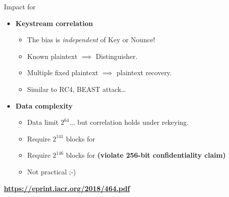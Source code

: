 \documentclass[aspectratio=169,10pt,webfont]{beamer}
\begin{document}

\begin{frame}{Impact for \MORUS}

\begin{itemize}
  \item \textbf{Keystream correlation}
    \begin{itemize}
      \item The bias is \textit{independent} of Key or Nounce!
      \item Known plaintext $\implies$ Distinguisher.
      \item Multiple fixed plaintext $\implies$ plaintext recovery.
      \item Similar to RC4, BEAST attack\ldots
    \end{itemize}
  \pause
  \item \textbf{Data complexity}
    \begin{itemize}
      \item Data limit $2^{64}$... but correlation holds under rekeying.
      \item Require $2^{141}$ blocks for \MORUS[640]
      \item Require $2^{146}$ blocks for \MORUS[1280] \textbf{\alert{(violate 256-bit confidentiality claim)}}
      \item Not practical ;-)
    \end{itemize}
\end{itemize}

\end{frame}


\begin{frame}[standout]

\centerline{\huge\textbf{\url{https://eprint.iacr.org/2018/464.pdf}}}

\end{frame}
\end{document}
